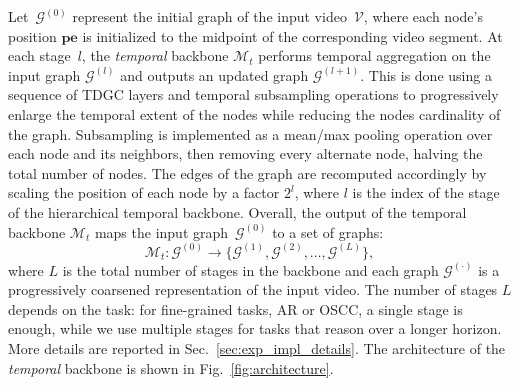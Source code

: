 Let~$\mathcal{G}^{(0)}$ represent the initial graph of the input video~$\mathcal{V}$, where each node's position $\mathbf{pe}$ is initialized to the midpoint of the corresponding video segment.
%
At each stage~$l$, the \emph{temporal} backbone $\mathcal{M}_{t}$ performs temporal aggregation on the input graph $\mathcal{G}^{(l)}$ and outputs an updated graph $\mathcal{G}^{(l+1)}$. This is done using a sequence of TDGC layers and temporal subsampling operations to progressively enlarge the temporal extent of the nodes
while reducing the nodes cardinality of the graph.
Subsampling is implemented as a mean/max pooling operation over each node and its neighbors, then removing every alternate node, halving the total number of nodes.
The edges of the graph are recomputed accordingly by scaling the position of each node by a factor $2^l$, where $l$ is the index of the stage of the hierarchical temporal backbone.
Overall, the output of the temporal backbone $\mathcal{M}_{t}$ maps the input graph~$\mathcal{G}^{(0)}$ to a set of graphs:
\begin{equation}
    \mathcal{M}_{t}: \mathcal{G}^{(0)} \to \{\mathcal{G}^{(1)}, \mathcal{G}^{(2)}, \dots, \mathcal{G}^{(L)}\},
\end{equation}
where $L$ is the total number of stages in the backbone and each graph $\mathcal{G}^{(\cdot)}$ is a progressively coarsened representation of the input video. The number of stages $L$ depends on the task: for fine-grained tasks, \eg AR or OSCC, a single stage is enough, while we use multiple stages for tasks that reason over a longer horizon. More details are reported in Sec.~\ref{sec:exp_impl_details}.
%
The architecture of the \emph{temporal} backbone is shown in Fig.~\ref{fig:architecture}.

